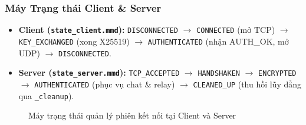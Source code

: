 \subsubsection{Máy Trạng thái Client \& Server}
\begin{itemize}
    \item \textbf{Client (\texttt{state\_client.mmd}):} \texttt{DISCONNECTED} $\rightarrow$ \texttt{CONNECTED} (mở TCP) $\rightarrow$ \texttt{KEY\_EXCHANGED} (xong X25519) $\rightarrow$ \texttt{AUTHENTICATED} (nhận AUTH\_OK, mở UDP) $\rightarrow$ \texttt{DISCONNECTED}.
    \item \textbf{Server (\texttt{state\_server.mmd}):} \texttt{TCP\_ACCEPTED} $\rightarrow$ \texttt{HANDSHAKEN} $\rightarrow$ \texttt{ENCRYPTED} $\rightarrow$ \texttt{AUTHENTICATED} (phục vụ chat & relay) $\rightarrow$ \texttt{CLEANED\_UP} (thu hồi lũy đẳng qua \texttt{\_cleanup}).
\end{itemize}

\begin{figure}[H]
    \centering
    \caption{Máy trạng thái quản lý phiên kết nối tại Client và Server}
    \label{fig:state_client_server}
\end{figure}

